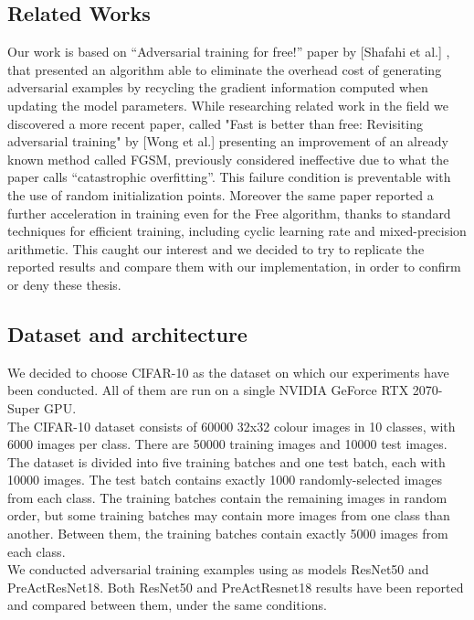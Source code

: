 \documentclass{article}
\begin{document}
\subsection{Related Works}
Our work is based on “Adversarial training for free!” paper by [Shafahi et al.]
\cite{ShafahiEtAl2019b}, that presented an algorithm able to eliminate the
overhead cost of generating adversarial examples by recycling the gradient
information computed when updating the model parameters. While researching
related work in the field we discovered a more recent paper, called "Fast is
better than free: Revisiting adversarial training" by [Wong et al.] \cite{WongEtAl2020}
presenting an improvement of an already known method called FGSM, previously
considered ineffective due to what the paper calls “catastrophic overfitting”.
This failure condition is preventable with the use of random initialization
points. Moreover the same paper reported a further acceleration in training even
for the Free algorithm, thanks to standard techniques for efficient training,
including cyclic learning rate and mixed-precision arithmetic. This caught our
interest and we decided to try to replicate the reported results and compare
them with our implementation, in order to confirm or deny these thesis.

\subsection{Dataset and architecture}

We decided to choose CIFAR-10 as the dataset on which our experiments have been
conducted. All of them are run on a single NVIDIA GeForce RTX 2070-Super GPU.\\
The CIFAR-10 dataset consists of 60000 32x32 colour images in 10 classes, with
6000 images per class. There are 50000 training images and 10000 test images.
The dataset is divided into five training batches and one test batch, each with
10000 images. The test batch contains exactly 1000 randomly-selected images from
each class. The training batches contain the remaining images in random order,
but some training batches may contain more images from one class than another.
Between them, the training batches contain exactly 5000 images from each
class.\\
We conducted adversarial training examples using as models ResNet50 and
PreActResNet18. Both ResNet50 and PreActResnet18 results have been reported and
compared between them, under the same conditions. 
\end{document}
